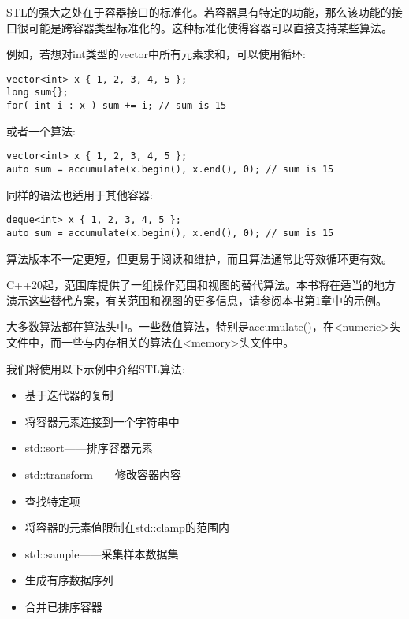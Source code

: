 STL的强大之处在于容器接口的标准化。若容器具有特定的功能，那么该功能的接口很可能是跨容器类型标准化的。这种标准化使得容器可以直接支持某些算法。

例如，若想对int类型的vector中所有元素求和，可以使用循环:

\begin{lstlisting}[style=styleCXX]
vector<int> x { 1, 2, 3, 4, 5 };
long sum{};
for( int i : x ) sum += i; // sum is 15
\end{lstlisting}

或者一个算法:

\begin{lstlisting}[style=styleCXX]
vector<int> x { 1, 2, 3, 4, 5 };
auto sum = accumulate(x.begin(), x.end(), 0); // sum is 15
\end{lstlisting}

同样的语法也适用于其他容器:

\begin{lstlisting}[style=styleCXX]
deque<int> x { 1, 2, 3, 4, 5 };
auto sum = accumulate(x.begin(), x.end(), 0); // sum is 15
\end{lstlisting}

算法版本不一定更短，但更易于阅读和维护，而且算法通常比等效循环更有效。

C++20起，范围库提供了一组操作范围和视图的替代算法。本书将在适当的地方演示这些替代方案，有关范围和视图的更多信息，请参阅本书第1章中的示例。

大多数算法都在算法头中。一些数值算法，特别是accumulate()，在<numeric>头文件中，而一些与内存相关的算法在<memory>头文件中。

我们将使用以下示例中介绍STL算法:

\begin{itemize}
\item 
基于迭代器的复制

\item 
将容器元素连接到一个字符串中

\item 
std::sort——排序容器元素

\item 
std::transform——修改容器内容

\item 
查找特定项

\item 
将容器的元素值限制在std::clamp的范围内

\item 
std::sample——采集样本数据集

\item 
生成有序数据序列

\item 
合并已排序容器
\end{itemize}













